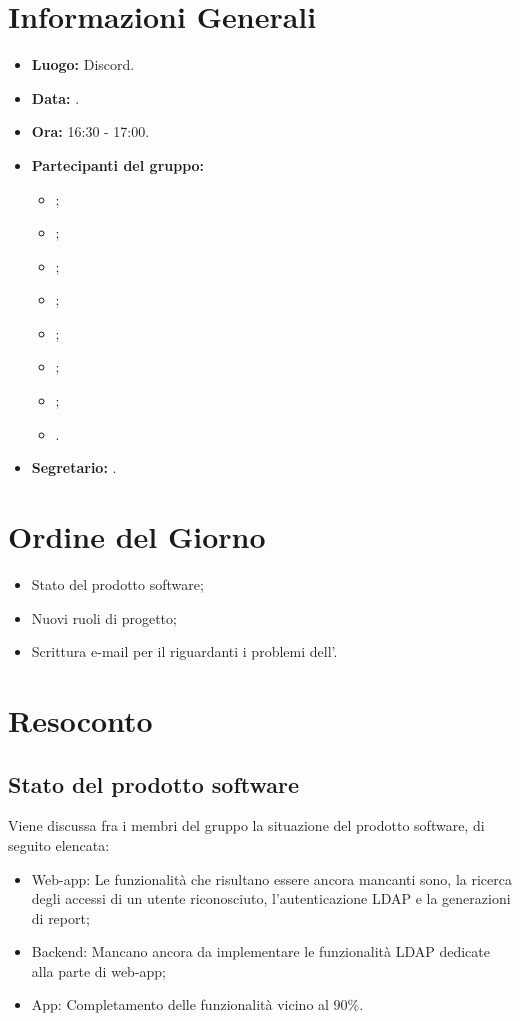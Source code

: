 \section{Informazioni Generali}
\begin{itemize}
\item \textbf{Luogo:} Discord.
\item \textbf{Data:} \Data.
\item \textbf{Ora:} 16:30 - 17:00.
\item \textbf{Partecipanti del gruppo:}
	\begin{itemize}
		\item \AT{}; 
		\item \BR{};
		\item \CE{}; 
		\item \DF{};
		\item \LD{};
		\item \MC{};
		\item \PF{};
		\item \SE{}.
	\end{itemize} 
\item \textbf{Segretario:} \PF{}.
\end{itemize}

\section{Ordine del Giorno}
\begin{itemize}
	\item Stato del prodotto software;
	\item Nuovi ruoli di progetto;
	\item Scrittura e-mail per il \CR{} riguardanti i problemi dell'\AdR{}.
\end{itemize}

\section{Resoconto}

\subsection{Stato del prodotto software}
Viene discussa fra i membri del gruppo la situazione del prodotto software, di seguito elencata:
\begin{itemize}
	\item Web-app: Le funzionalità che risultano essere ancora mancanti sono, la ricerca degli accessi di un utente riconosciuto, l'autenticazione LDAP e la generazioni di report;
	\item Backend: Mancano ancora da implementare le funzionalità LDAP dedicate alla parte di web-app;
	\item App: Completamento delle funzionalità vicino al 90\%.
\end{itemize}
